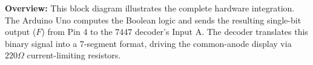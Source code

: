 \documentclass[12pt, a4paper]{article}
\begin{document}
\begin{circuitbox}
																																																																																																																																																																																																																																																				      \textbf{Overview:} This block diagram illustrates the complete hardware integration. The Arduino Uno computes the Boolean logic and sends the resulting single-bit output ($F$) from Pin 4 to the 7447 decoder's Input A. The decoder translates this binary signal into a 7-segment format, driving the common-anode display via $220\Omega$ current-limiting resistors.
																																																																																																																																																																																																																																																				      \end{circuitbox}
\end{document}
